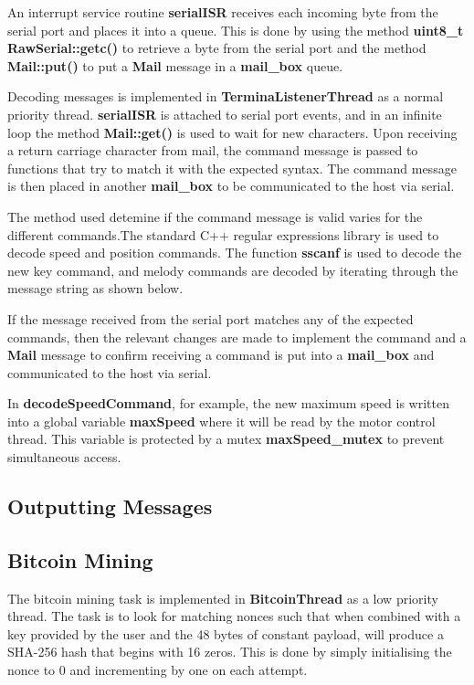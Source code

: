 \documentclass{article}
\begin{document}
An interrupt service routine \textbf{serialISR} receives each incoming byte from the serial port and places it into a queue. This is done by using the method \textbf{uint8\_t RawSerial::getc()} to retrieve a byte from the serial port and the method \textbf{Mail::put()} to put a \textbf{Mail} message in a \textbf{mail\_box} queue.
\bigskip

Decoding messages is implemented in \textbf{TerminaListenerThread} as a normal priority thread. \textbf{serialISR} is attached to serial port events, and in an infinite loop the method \textbf{Mail::get()} is used to wait for new characters. Upon receiving a return carriage character from mail, the command message is passed to functions that try to match it with the expected syntax. The command message is then placed in another \textbf{mail\_box} to be communicated to the host via serial.

\bigskip
   
\bigskip       

The method used detemine if the command message is valid varies for the different commands.The standard C++ regular expressions library is used to decode speed and position commands. The function \textbf{sscanf} is used to decode the new key command, and melody commands are decoded by iterating through the message string as shown below.

\bigskip
  
\bigskip
If the message received from the serial port matches any of the expected commands, then the relevant changes are made to implement the command and a \textbf{Mail} message to confirm receiving a command is put into a \textbf{mail\_box} and communicated to the host via serial. 
\bigskip

In \textbf{decodeSpeedCommand}, for example, the new maximum speed is written into a global variable \textbf{maxSpeed} where it will be read by the motor control thread. This variable is protected by a mutex \textbf{maxSpeed\_mutex} to prevent simultaneous access.


\subsection{Outputting Messages}

\subsection{Bitcoin Mining}

The bitcoin mining task is implemented in \textbf{BitcoinThread} as a low priority thread. The task is to look for matching nonces such that when combined with a key provided by the user and the 48 bytes of constant payload, will produce a SHA-256 hash that begins with 16 zeros. This is done by simply initialising the nonce to 0 and incrementing by one on each attempt. 
\end{document}

